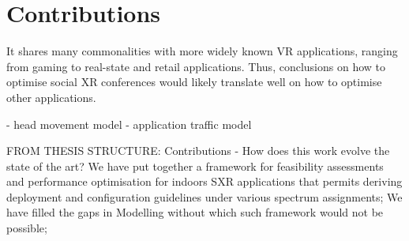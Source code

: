 \section{Contributions}
\label{sec:contributions}


It shares many commonalities with more widely known \ac{VR} applications, ranging from gaming to real-state and retail applications. Thus, conclusions on how to optimise social \ac{XR} conferences would likely translate well on how to optimise other applications. 



- head movement model
- application traffic model

FROM THESIS STRUCTURE: 
Contributions - How does this work evolve the state of the art?
We have put together a framework for feasibility assessments and performance optimisation for indoors SXR applications that permits deriving deployment and configuration guidelines under various spectrum assignments;
We have filled the gaps in Modelling without which such framework would not be possible;
